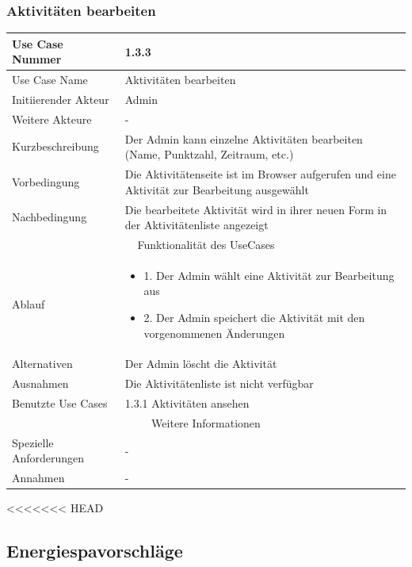 \documentclass[10pt,a4paper]{article}
\begin{document}
	\subsubsection{Aktivit\"aten bearbeiten}
	\begin{tabular}{|l|p{.5\linewidth}|}
	\hline Use Case Nummer & 1.3.3 \\ 
	\hline Use Case Name & Aktivit\"aten bearbeiten \\ 
	\hline Initiierender Akteur & Admin \\
	\hline Weitere Akteure & - \\
	\hline Kurzbeschreibung & Der Admin kann einzelne Aktivit\"aten bearbeiten (Name, Punktzahl, Zeitraum, etc.) \\
	\hline Vorbedingung & Die Aktivit\"atenseite ist im Browser aufgerufen und eine Aktivit\"at zur Bearbeitung ausgew\"ahlt \\
	\hline Nachbedingung & Die bearbeitete Aktivit\"at wird in ihrer neuen Form in der Aktivit\"atenliste angezeigt \\
	\hline \multicolumn{2}{|c|}{Funktionalität des UseCases}\\
	\hline Ablauf & \begin{itemize}
			\item 1. Der Admin w\"ahlt eine Aktivit\"at zur Bearbeitung aus
			\item 2. Der Admin speichert die Aktivit\"at mit den vorgenommenen \"Anderungen
		\end{itemize} \\
	\hline Alternativen & Der Admin l\"oscht die Aktivit\"at \\
	\hline Ausnahmen & Die Aktivit\"atenliste ist nicht verf\"ugbar \\
	\hline Benutzte Use Cases & 1.3.1 Aktivit\"aten ansehen \\
	\hline \multicolumn{2}{|c|}{Weitere Informationen} \\
	\hline Spezielle Anforderungen & - \\
	\hline Annahmen & - \\
	\hline
	\end{tabular} 
<<<<<<< HEAD
\subsection{Energiespavorschl\"age}
\end{document}
